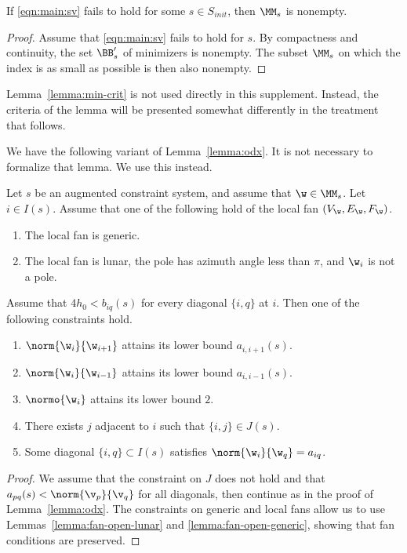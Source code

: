 \begin{lemma}\label{lemma:init}
If \eqref{eqn:main:sv} fails to hold for some $s\in S_{init}$, 
then $\MM_s$ is nonempty.
\end{lemma}

\begin{proof}  Assume that \eqref{eqn:main:sv} fails to hold for
$s$.  By compactness and continuity, the set 
$\BB'_s$ of minimizers is nonempty.   
The subset $\MM_s$ on which the index is as small as possible
is then also nonempty.
\end{proof}

Lemma~\ref{lemma:min-crit} is not used directly in this supplement.
Instead, the criteria of the lemma will be presented somewhat differently
in the treatment that follows.

We have the following variant of Lemma~\ref{lemma:odx}.
It is not necessary to formalize that lemma.  We use this instead.

\begin{lemma} Let $s$ be an augmented constraint system,
and assume that $\w\in \MM_s$.  Let $i\in I(s)$.
Assume  that one of the following hold of the local fan $(V_\w,E_\w,F_\w)$.
\begin{enumerate}
\item The local fan is generic.
\item The local fan is lunar, the pole has azimuth
angle less than $\pi$, and $\w_i$ is not a pole.  
\end{enumerate}
Assume that $4h_0 < b_{iq}(s)$ for every diagonal $\{i,q\}$ at $i$.
Then one of the following   constraints hold.
\begin{enumerate}
\item $\norm{\w_i}{\w_{i+1}}$ attains its lower bound $a_{i,i+1}(s)$.
\item $\norm{\w_i}{\w_{i-1}}$ attains its lower bound $a_{i,i-1}(s)$.
\item $\normo{\w_i}$ attains its lower bound $2$.
\item There exists $j$ adjacent to $i$ such that $\{i,j\}\in J(s)$.
\item Some diagonal $\{i,q\}\subset I(s)$ satisfies
$\norm{\w_i}{\w_q}=a_{i q}$.
\end{enumerate}
\end{lemma}

\begin{proof} 
We assume that the constraint on $J$ does not hold and
that $a_{p q}(s)<\norm{\v_p}{\v_q}$ for all diagonals, then continue as in the proof of
Lemma~\ref{lemma:odx}.  The constraints on generic and local fans
allow us to use Lemmas~\ref{lemma:fan-open-lunar} and
\ref{lemma:fan-open-generic}, showing that fan conditions are preserved.
\end{proof}

